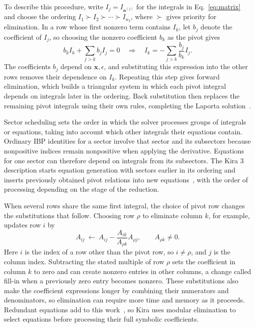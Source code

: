 To describe this procedure, write $I_j=I_{\boldsymbol a^{(j)}}$ for the
integrals in Eq.~\eqref{eq:matrix} and choose the ordering
$I_1\succ I_2\succ\cdots\succ I_{n_I}$, where $\succ$ gives priority
for elimination. In a row whose first nonzero term contains $I_k$, let
$b_j$ denote the coefficient of $I_j$, so choosing the nonzero coefficient
$b_k$ as the pivot gives
\begin{equation}
 b_k I_k+\sum_{j>k}b_j I_j=0
 \quad\Longrightarrow\quad
 I_k=-\sum_{j>k}\frac{b_j}{b_k}I_j.
 \label{eq:pivot}
\end{equation}
The coefficients $b_j$ depend on $\boldsymbol x,\epsilon$, and substituting
this expression into the other rows removes their dependence on $I_k$.
Repeating this step gives forward elimination, which builds a triangular
system in which each pivot integral depends on integrals later in the
ordering. Back substitution then replaces the remaining pivot integrals
using their own rules, completing the Laporta solution~\cite{Laporta}.

Sector scheduling sets the order in which the solver processes groups of
integrals or equations, taking into account which other integrals their
equations contain. Ordinary IBP identities for a sector involve that
sector and its subsectors because nonpositive indices remain nonpositive
when applying the derivative. Equations for one sector can therefore
depend on integrals from its subsectors. The Kira 3 description starts
equation generation with sectors earlier in its ordering and inserts
previously obtained pivot relations into new equations~\cite{Kira3},
with the order of processing depending on the stage of the reduction.

When several rows share the same first integral, the choice of pivot row
changes the substitutions that follow. Choosing row $\rho$ to eliminate
column $k$, for example, updates row $i$ by
\begin{equation}
 A_{ij}\ \longleftarrow\ A_{ij}
 -\frac{A_{ik}}{A_{\rho k}}A_{\rho j},
 \qquad A_{\rho k}\ne0.
 \label{eq:row-update}
\end{equation}
Here $i$ is the index of a row other than the pivot row, so $i\ne\rho$,
and $j$ is the column index.
Subtracting the stated multiple of row $\rho$ sets the coefficient in
column $k$ to zero and can create nonzero entries in other columns,
a change called fill-in when a previously zero entry becomes nonzero.
These substitutions also make the coefficient expressions longer by
combining their numerators and denominators, so elimination can require
more time and memory as it proceeds. Redundant equations add to this
work~\cite{Kant}, so Kira uses modular elimination to
select equations before processing their full symbolic coefficients.

